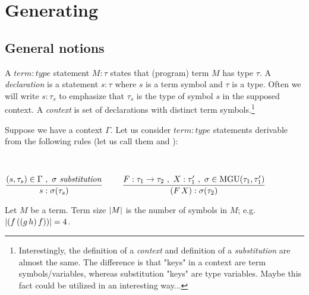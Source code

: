 \documentclass[a4paper,oneside]{memoir}
\begin{document}
\chapter{Generating}

\section{General notions}

\begin{definition}
A $\mathit{term:type}$ statement $\mathit{M}:\mathit{\tau}$ states that (program) term $M$ has type $\tau$.   
A \textit{declaration} is a statement $s : \tau$ where $s$ is a term symbol and $\tau$ is a type.
Often we will write $s : \tau_s$ to emphasize that $\tau_s$ is the type of symbol $s$ in the supposed context.
A \textit{context} is set of declarations with distinct term symbols.\footnote{Interestingly, the definition of a \textit{context} and definition of a \textit{substitution} are almost the same. The difference is that "keys" in a context are term symbols/variables, whereas substitution "keys" are type variables. Maybe this fact could be utilized in an interesting way...}
\end{definition}


Suppose we have a context $\Gamma$. Let us consider $\mathit{term:type}$ statements derivable from the following rules (let us call them \subAx and \mguMp):

~

$\dfrac{(s,\tau_s) \in \Gamma\ ,\ \sigma\ \mathit{substitution}}{s : \sigma(\tau_s)}$
~~~
$\dfrac{F : \tau_1 \rightarrow \tau_2\ ,\ X : \tau^\prime_1\ , \ \sigma \in \operatorname{MGU}(\tau_1,\tau^\prime_1)}{(F\,X) : \sigma(\tau_2)}$


\begin{definition}
Let $M$ be a term. Term size $\lvert M \rvert$ is the number of symbols in $M$; e.g. $\lvert (f\,((g\,h)\,f)) \rvert = 4$. 
\end{definition}

\newcommand{\inhab}[1]{\op{I}(#1)}

\newcommand{\tord}{\preccurlyeq}
\newcommand{\stord}{\prec}
\newcommand{\ordt}{\tord_\tau}
\newcommand{\tek}{\sim}
\newcommand{\ntek}{\nsim}
\newcommand{\ekt}{\tek_\tau}
\newcommand{\nekt}{\ntek_\tau}
\newcommand{\nsucct}{\nsucc_\tau}

\newcommand{\MGI}[1]{\op{MGI}(#1)}
\newcommand{\MGIt}{\MGI{\tau}}
\newcommand{\It}{\op{I}(\tau)}

\newcommand{\ids}{\sigma_{\op{id}}}
\end{document}
